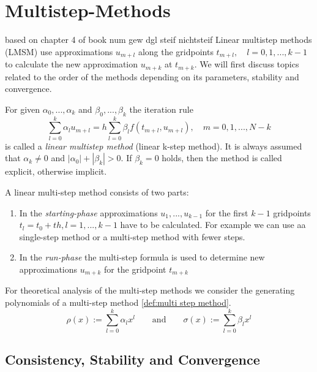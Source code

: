 			
\section{Multistep-Methods}
	based on chapter 4 of book num gew dgl steif nichtsteif \newline
	Linear multistep methods (LMSM) use approximations $u_{m+l}$ along the gridpoints $t_{m+l}, \quad l=0,1,...,k-1$ to calculate the new approximation $u_{m+k}$ at $t_{m+k}$. We will first discuss topics related to the order of the methods depending on its parameters, stability and convergence.
	
	\begin{definition}
		\label{def:multi step method}
		For given $\alpha_0, ..., \alpha_k$ and $\beta_0, ..., \beta_k$ the iteration rule
		\begin{equation}
			\label{linear-multistep-method}
			\sum_{l=0}^{k} \alpha_l u_{m+l} = h \sum_{l=0}^{k} \beta_l f(t_{m+l}, u_{m+l}), \quad m=0,1,...,N-k
		\end{equation}
		is called a \emph{linear multistep method} (linear k-step method). It is always assumed that $\alpha_k \neq 0$ and $|\alpha_0| + |\beta_k| > 0$. If $\beta_k=0$ holds, then the method is called explicit, otherwise implicit.
	\end{definition}
	
	A linear multi-step method consists of two parts:
	\begin{enumerate}
		\item In the \emph{starting-phase} approximations $u_1,...,u_{k-1}$ for the first $k-1$ gridpoints $t_l = t_0+th, l=1,...,k-1$ have to be calculated. For example we can use aa single-step method or a multi-step method with fewer steps.
		
		\item  In the \emph{run-phase} the multi-step formula is used to determine new approximations $u_{m+k}$ for the gridpoint $t_{m+k}$
	\end{enumerate}
	
	For theoretical analysis of the multi-step methods we consider the generating polynomials of a multi-step method \ref{def:multi step method}.
	\begin{equation}
		\label{eq:generating polynomials multistep method}
		\rho(x) := \sum_{l=0}^{k} \alpha_l x^l
		\qquad \text{and} \qquad
		\sigma(x) := \sum_{l=0}^{k} \beta_l x^l
	\end{equation}
			
	
	\subsection{Consistency, Stability and Convergence}
	\cite{NumerikGewöhnlicherDifferentialgleichungen}
	
